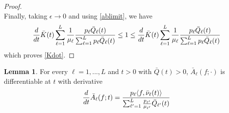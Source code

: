 \documentclass{article}
\theoremstyle{definition}
\newtheorem{lemma}[theorem]{Lemma}
\numberwithin{equation}{section}
\begin{document}
\begin{proof}
\begin{equation}
\end{equation}
Finally, taking $\epsilon\to 0$ and using \eqref{ablimit}, we have
\begin{equation}
  \frac{d}{dt}\bar K(t) \sum_{\ell=1}^{L}\frac{1}{\mu_{\ell}}\frac{p_{\ell}\bar Q_{\ell}(t)}{\sum_{\ell=1}^{L}p_{\ell}\bar Q_{\ell}(t)} \leq 1 \leq
  \frac{d}{dt}\bar K(t) \sum_{\ell=1}^{L}\frac{1}{\mu_{\ell}}\frac{p_{\ell}\bar Q_{\ell}(t)}{\sum_{\ell=1}^{L}p_{\ell}\bar Q_{\ell}(t)}
\end{equation}
which proves \eqref{Kdot}.
\end{proof}



\begin{lemma}
  For every $\ell=1,...,L$ and $t>0$ with $\bar Q(t)>0$,  $\bar A_\ell(f;\cdot)$ is differentiable at $t$ with derivative
  \begin{equation}\label{Adot}
    \frac{d}{dt}\bar A_\ell(f;t) =\frac{p_\ell\langle f,\bar{\nu}_\ell(t)\rangle}{\sum_{\ell'=1}^{L}\frac{p_{\ell'}}{\mu_{\ell'}}\bar Q_{\ell'}(t)}
  \end{equation}

\end{lemma}
\end{document}
